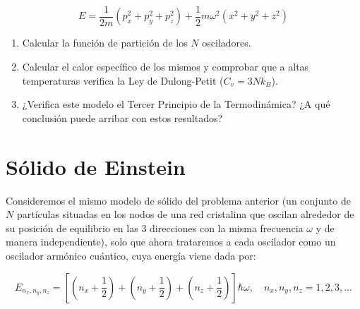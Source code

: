 \documentclass[a4paper,11pt]{article}
\begin{document}
$$ E = \frac{1}{2m}(p_x^2 + p_y^2 + p_z^2) +
       \frac{1}{2} m \omega^2 (x^2 + y^2 + z^2) $$


\begin{enumerate}[label=(\alph*),
                  leftmargin=2\parindent,
                  rightmargin=2\parindent]

    \item{Calcular la función de partición de los $N$ osciladores.}

    \item{Calcular el calor específico de los mismos y comprobar que a
          altas temperaturas verifica la Ley de Dulong-Petit
          ($C_v = 3Nk_B$).}

    \item{¿Verifica este modelo el Tercer Principio de la
          Termodinámica? ¿A qué conclusión puede arribar con estos
          resultados?}

\end{enumerate}



\section{Sólido de Einstein}

Consideremos el mismo modelo de sólido del problema anterior (un
conjunto de $N$ partículas situadas en los nodos de una red cristalina
que oscilan alrededor de su posición de equilibrio en las 3 direcciones
con la misma frecuencia $\omega$ y de manera independiente), solo que
ahora trataremos a cada oscilador como un oscilador armónico
cuántico, cuya energía viene dada por:

$$
E_{n_x, n_y, n_z} = \left[
                    \left( n_x + \frac{1}{2} \right) +
                    \left( n_y + \frac{1}{2} \right) +
                    \left( n_z + \frac{1}{2} \right)
                    \right]
                    \hbar \omega,
\quad
n_x, n_y, n_z = 1, 2, 3, \dots
$$
\end{document}
